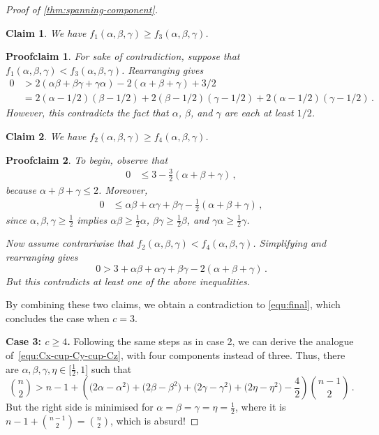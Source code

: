\documentclass[10pt,a4paper]{amsart}
\newtheorem{claim}{Claim}
\newtheorem{proofclaim}{Proofclaim}
\newcommand{\al}{\alpha}
\newcommand{\be}{\beta}
\newcommand{\ce}{\gamma}
\begin{document}
\begin{proof}[Proof of \cref{thm:spanning-component}]
		\begin{claim}
			We have $f_1(\alpha,\beta,\gamma)\ge f_3(\alpha,\beta,\gamma)$.
		\end{claim}
		\begin{proofclaim}
			For sake of contradiction, suppose that $f_1(\alpha,\beta,\gamma) < f_3(\alpha,\beta,\gamma)$.
			Rearranging gives
			\begin{align*}
				0 & > 2(\al\be +\be\ce + \ce\al) - 2(\al+\be+\ce) + 3/2 \\ & = 2(\al-1/2)(\be-1/2) + 2(\be-1/2)(\ce-1/2) + 2(\al-1/2)(\ce-1/2)   \,.
			\end{align*}
			However, this contradicts the fact that $\alpha$, $\beta$, and $\gamma$ are each at least $1/2$.
		\end{proofclaim}
		
		\begin{claim}
			We have  $f_2(\alpha,\beta,\gamma)\ge f_4(\alpha,\beta,\gamma)$.
		\end{claim} 
		\begin{proofclaim}
			To begin, observe that 
			\begin{align*}
				0&\le 3-\frac{3}{2}(\al+\be+\ce) \,,
			\end{align*}
			because $\al+\be+\ce\le2$.
			Moreover,
			\begin{align*}
				0&\le \al\be+\al\ce+\be\ce-\frac{1}{2}(\al+\be+\ce)\,,
			\end{align*}
			since $\al,\be,\ce\ge \frac{1}{2}$ implies $\al\be\ge \frac{1}{2}\al$, $\be\ce\ge\frac{1}{2}\be$, and $\ce\al\ge\frac{1}{2}\ce$.
			
			Now assume contrariwise that  $f_2(\alpha,\beta,\gamma) < f_4(\alpha,\beta,\gamma)$.
			Simplifying and rearranging gives
			\[0 > 3+\al\be+\al\ce+\be\ce-2(\al+\be+\ce) \,.\]
			But this contradicts at least one of the above inequalities.
		\end{proofclaim}
		
		By combining these two claims, we obtain a contradiction to \eqref{equ:final}, which concludes the case when $c=3$.
		
		
		
		\medskip
		\textbf{Case 3: $c\geq4$.} Following the same steps as in case 2, we can derive the analogue of~\eqref{equ:Cx-cup-Cy-cup-Cz}, with four components instead of three. Thus, there are $\alpha,\beta,\gamma,\eta\in \big[\frac{1}{2},1\big]$ such that
		\[\binom{n}{2}>n-1+\left(\big(2\al-\al^2\big)+\big(2\be-\be^2\big)+\big(2\ce-\ce^2\big)+\big(2\eta-\eta^2\big)-\frac{4}{2}\right)\binom{n-1}{2} \,.\]
		But the right side is minimised for $\alpha=\beta=\gamma=\eta=\frac{1}{2}$, where it is $n-1+\binom{n-1}{2}=\binom{n}{2}$, which is absurd!
	\end{proof}
\end{document}
